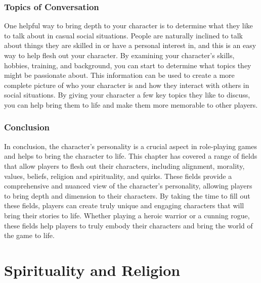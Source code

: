 \documentclass[12pt]{book}  %
\begin{document}
\subsection{\textbf{Topics of Conversation}}

One helpful way to bring depth to your character is to determine what they like to talk about in casual social situations. People are naturally inclined to talk about things they are skilled in or have a personal interest in, and this is an easy way to help flesh out your character. By examining your character's skills, hobbies, training, and background, you can start to determine what topics they might be passionate about. This information can be used to create a more complete picture of who your character is and how they interact with others in social situations. By giving your character a few key topics they like to discuss, you can help bring them to life and make them more memorable to other players.

\subsection{\textbf{Conclusion}}

In conclusion, the character's personality is a crucial aspect in role-playing games and helps to bring the character to life. This chapter has covered a range of fields that allow players to flesh out their characters, including alignment, morality, values, beliefs, religion and spirituality, and quirks. These fields provide a comprehensive and nuanced view of the character's personality, allowing players to bring depth and dimension to their characters. By taking the time to fill out these fields, players can create truly unique and engaging characters that will bring their stories to life. Whether playing a heroic warrior or a cunning rogue, these fields help players to truly embody their characters and bring the world of the game to life.


\chapter{Spirituality and Religion}
\end{document}
